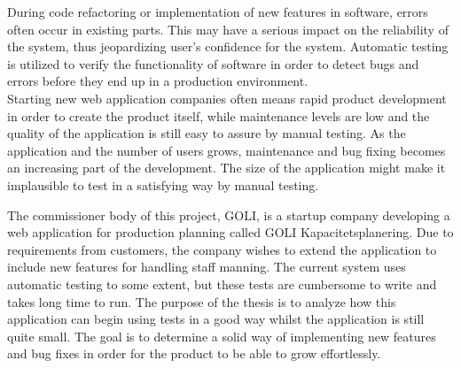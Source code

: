 During code refactoring or implementation of new features in software,
errors often occur in existing parts. This may have a serious impact on
the reliability of the system, thus jeopardizing user's confidence for
the system. Automatic testing is utilized to verify the functionality of
software in order to detect bugs and errors before they end up in a
production environment.\\

Starting new web application companies often means rapid product
development in order to create the product itself, while maintenance
levels are low and the quality of the application is still easy to
assure by manual testing. As the application and the number of users
grows, maintenance and bug fixing becomes an increasing part of the
development. The size of the application might make it implausible to
test in a satisfying way by manual testing.

The commissioner body of this project, GOLI, is a startup company
developing a web application for production planning called GOLI
Kapacitetsplanering. Due to requirements from customers, the company
wishes to extend the application to include new features for handling
staff manning. The current system uses automatic testing to some extent,
but these tests are cumbersome to write and takes long time to run. The
purpose of the thesis is to analyze how this application can begin using
tests in a good way whilst the application is still quite small. The
goal is to determine a solid way of implementing new features and bug
fixes in order for the product to be able to grow effortlessly.\\
